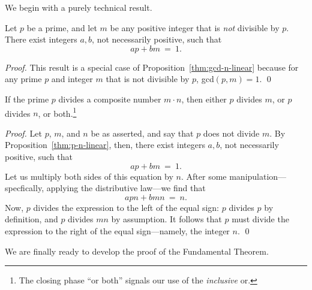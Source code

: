 We begin with a purely technical result.

\begin{prop}
\label{thm:p-n-linear}
Let $p$ be a prime, and let $m$ be any positive integer that is {\em
  not} divisible by $p$.  There exist integers $a, b$, not necessarily
positive, such that
\[ ap + bm \ = \ 1. \]
\end{prop}

\begin{proof}
This result is a special case of Proposition~\ref{thm:gcd-n-linear}
because for any prime $p$ and integer $m$ that is not divisible by
$p$, {\sc gcd}$(p, m) = 1$.
\qed
\end{proof}

\begin{prop}
\label{thm:p-divides-onefactor}
If the prime $p$ divides a composite number $m \cdot n$, then either
$p$ divides $m$, or $p$ divides $n$, or both.\footnote{The closing
  phase ``or both'' signals our use of the {\em inclusive} or.}
\end{prop}

\begin{proof}
Let $p$, $m$, and $n$ be as asserted, and say that $p$ does not divide
$m$.  By Proposition~\ref{thm:p-n-linear}, then, there exist integers
$a, b$, not necessarily positive, such that
\[ ap + bm \ = \ 1. \]
Let us multiply both sides of this equation by $n$.  After some
manipulation---specfically, applying the distributive law---we find
that
\[ apn + bmn \ = \ n. \]
Now, $p$ divides the expression to the left of the equal sign: $p$
divides $p$ by definition, and $p$ divides $mn$ by assumption.  It
follows that $p$ must divide the expression to the right of the equal
sign---namely, the integer $n$.  \qed
\end{proof}

We are finally ready to develop the proof of the Fundamental Theorem.

